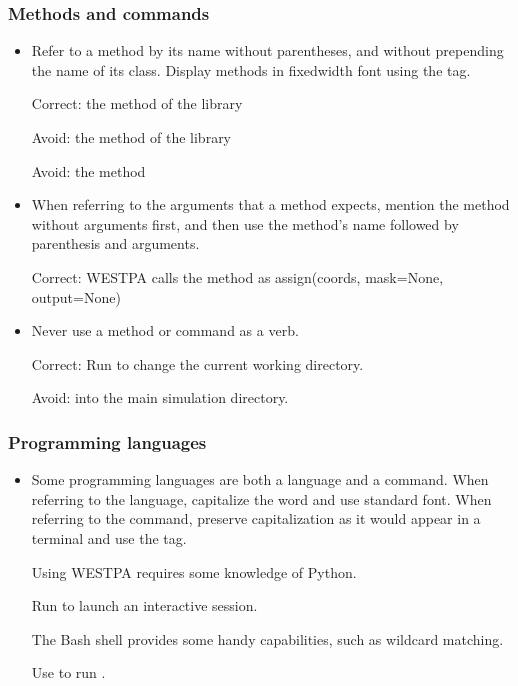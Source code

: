 \documentclass[letterpaper,10pt,english]{sphinxmanual}
\begin{document}
\subsubsection{Methods and commands}
\label{\detokenize{development/style_guide:methods-and-commands}}\begin{itemize}
\item {} 
Refer to a method by its name without parentheses, and without prepending
the name of its class. Display methods in fixed\sphinxhyphen{}width font using the \sphinxcode{\sphinxupquote{\textasciigrave{}\textasciigrave{}}}
tag.

Correct: the  method of the  library

Avoid: the  method of the  library

Avoid: the  method

\item {} 
When referring to the arguments that a method expects, mention the method
without arguments first, and then use the method’s name followed by
parenthesis and arguments.

Correct: WESTPA calls the  method as assign(coords, mask=None,
output=None)

\item {} 
Never use a method or command as a verb.

Correct: Run  to change the current working directory.

Avoid:  into the main simulation directory.

\end{itemize}


\subsubsection{Programming languages}
\label{\detokenize{development/style_guide:programming-languages}}\begin{itemize}
\item {} 
Some programming languages are both a language and a command. When referring
to the language, capitalize the word and use standard font. When referring
to the command, preserve capitalization as it would appear in a terminal and
use the \sphinxcode{\sphinxupquote{\textasciigrave{}\textasciigrave{}}} tag.

Using WESTPA requires some knowledge of Python.

Run  to launch an interactive session.

The Bash shell provides some handy capabilities, such as wildcard matching.

Use  to run .

\end{itemize}
\end{document}
